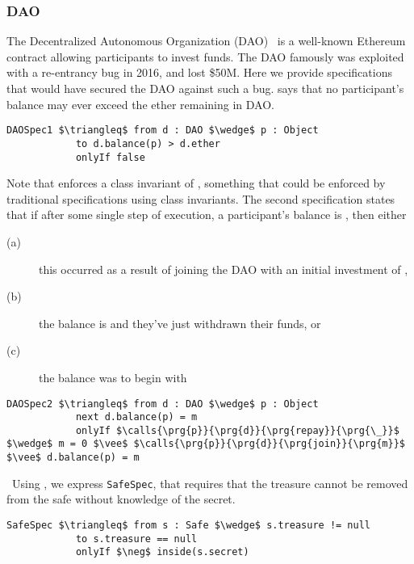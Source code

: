 \subsubsection{DAO}
The Decentralized Autonomous Organization (DAO)~\cite{Dao}  is a well-known Ethereum contract allowing 
participants to invest funds. The DAO famously was exploited with a re-entrancy bug in 2016, 
and lost \$50M. Here we provide specifications that would have secured the DAO against such a 
bug.  says that no participant's balance may ever exceed the ether remaining 
in DAO.
\begin{lstlisting}[language = Chainmail, mathescape=true, frame=lines]
DAOSpec1 $\triangleq$ from d : DAO $\wedge$ p : Object
            to d.balance(p) > d.ether
            onlyIf false
\end{lstlisting}
Note that  enforces a class invariant of , something that could be enforced
by traditional specifications using class invariants.
The second specification  states that if after some single step of execution, a participant's balance is , then 
either 
\begin{description}
\item[(a)] this occurred as a result of joining the DAO with an initial investment of , 
\item[(b)] the balance is  and they've just withdrawn their funds, or 
\item[(c) ]the balance was  to begin with
\end{description}
\begin{lstlisting}[language = Chainmail, mathescape=true, frame=lines]
DAOSpec2 $\triangleq$ from d : DAO $\wedge$ p : Object
            next d.balance(p) = m
            onlyIf $\calls{\prg{p}}{\prg{d}}{\prg{repay}}{\prg{\_}}$ $\wedge$ m = 0 $\vee$ $\calls{\prg{p}}{\prg{d}}{\prg{join}}{\prg{m}}$ $\vee$ d.balance(p) = m
\end{lstlisting}

\ Using \Nec, we express \texttt{SafeSpec}, that requires that the treasure cannot be 
removed from the safe without knowledge of the secret.
\begin{lstlisting}[language = Chainmail, mathescape=true, frame=lines]
SafeSpec $\triangleq$ from s : Safe $\wedge$ s.treasure != null
            to s.treasure == null
            onlyIf $\neg$ inside(s.secret)
\end{lstlisting}

